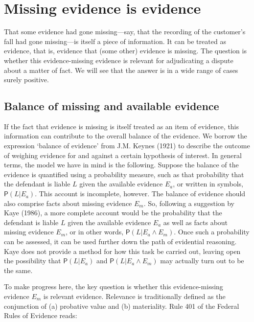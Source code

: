 \documentclass[
  10pt,
  dvipsnames,enabledeprecatedfontcommands]{scrartcl}
\newcommand{\pr}[1]{\mathsf{P}(#1)}
\begin{document}
\hypertarget{missing-evidence-is-evidence}{%
\section{Missing evidence is
evidence}\label{missing-evidence-is-evidence}}

\label{sec:missing-evidence-evidence}

That some evidence had gone missing---say, that the recording of the
customer's fall had gone missing---is itself a piece of information. It
can be treated as evidence, that is, evidence that (some other) evidence
is missing. The question is whether this evidence-missing evidence is
relevant for adjudicating a dispute about a matter of fact. We will see
that the answer is in a wide range of cases surely positive.

\hypertarget{balance-of-missing-and-available-evidence}{%
\subsection{Balance of missing and available
evidence}\label{balance-of-missing-and-available-evidence}}

If the fact that evidence is missing is itself treated as an item of
evidence, this information can contribute to the overall balance of the
evidence. We borrow the expression `balance of evidence' from J.M.
Keynes (1921) to describe the outcome of weighing evidence for and
against a certain hypothesis of interest. In general terms, the model we
have in mind is the following. Suppose the balance of the evidence is
quantified using a probability measure, such as that probability that
the defendant is liable \(L\) given the available evidence \(E_a\), or
written in symbols, \(\pr{L \vert E_a}\). This account is incomplete,
however. The balance of evidence should also comprise facts about
missing evidence \(E_m\). So, following a suggestion by Kaye (1986), a
more complete account would be the probability that the defendant is
liable \(L\) given the available evidence \(E_a\) as well as facts about
missing evidence \(E_m\), or in other words,
\(\pr{L \vert E_a \wedge E_m}\). Once such a probability can be
assessed, it can be used further down the path of evidential reasoning.
Kaye does not provide a method for how this task be carried out, leaving
open the possibility that \(\pr{L \vert E_a}\) and
\(\pr{L \vert E_a \wedge E_m}\) may actually turn out to be the same.

To make progress here, the key question is whether this evidence-missing
evidence \(E_m\) is relevant evidence. Relevance is traditionally
defined as the conjunction of (a) probative value and (b) materiality.
Rule 401 of the Federal Rules of Evidence reads:
\end{document}
